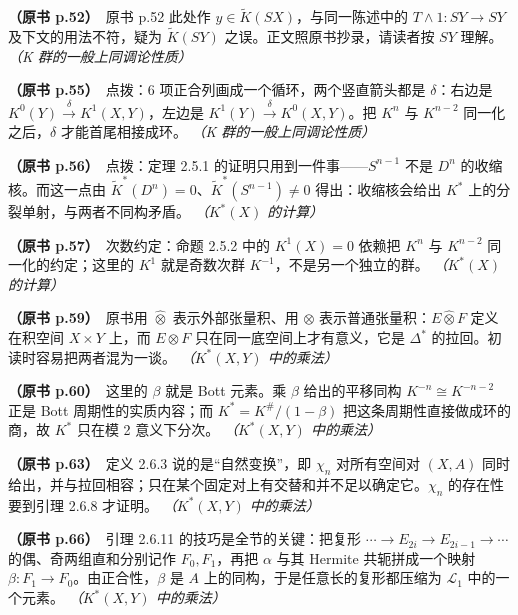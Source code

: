 \noindent \textbf{（原书 p.52）}\ 原书 p.52 此处作 $y\in\tilde K(SX)$，与同一陈述中的 $T\wedge1\colon SY\to SY$ 及下文的用法不符，疑为 $\tilde K(SY)$ 之误。正文照原书抄录，请读者按 $SY$ 理解。 \textit{（K 群的一般上同调论性质）}\par\smallskip

\noindent \textbf{（原书 p.55）}\ 点拨：6 项正合列画成一个循环，两个竖直箭头都是 $\delta$：右边是 $K^0(Y)\xrightarrow{\delta}K^1(X,Y)$，左边是 $K^1(Y)\xrightarrow{\delta}K^0(X,Y)$。把 $K^n$ 与 $K^{n-2}$ 同一化之后，$\delta$ 才能首尾相接成环。 \textit{（K 群的一般上同调论性质）}\par\smallskip

\noindent \textbf{（原书 p.56）}\ 点拨：定理 2.5.1 的证明只用到一件事——$S^{n-1}$ 不是 $D^n$ 的收缩核。而这一点由 $\tilde K^*(D^n)=0$、$\tilde K^*(S^{n-1})\ne0$ 得出：收缩核会给出 $K^*$ 上的分裂单射，与两者不同构矛盾。 \textit{（$K^*(X)$ 的计算）}\par\smallskip

\noindent \textbf{（原书 p.57）}\ 次数约定：命题 2.5.2 中的 $K^1(X)=0$ 依赖把 $K^n$ 与 $K^{n-2}$ 同一化的约定；这里的 $K^1$ 就是奇数次群 $K^{-1}$，不是另一个独立的群。 \textit{（$K^*(X)$ 的计算）}\par\smallskip

\noindent \textbf{（原书 p.59）}\ 原书用 $\hat\otimes$ 表示外部张量积、用 $\otimes$ 表示普通张量积：$E\hat\otimes F$ 定义在积空间 $X\times Y$ 上，而 $E\otimes F$ 只在同一底空间上才有意义，它是 $\Delta^*$ 的拉回。初读时容易把两者混为一谈。 \textit{（$K^*(X,Y)$ 中的乘法）}\par\smallskip

\noindent \textbf{（原书 p.60）}\ 这里的 $\beta$ 就是 Bott 元素。乘 $\beta$ 给出的平移同构 $K^{-n}\cong K^{-n-2}$ 正是 Bott 周期性的实质内容；而 $K^*=K^{\#}/(1-\beta)$ 把这条周期性直接做成环的商，故 $K^*$ 只在模 2 意义下分次。 \textit{（$K^*(X,Y)$ 中的乘法）}\par\smallskip

\noindent \textbf{（原书 p.63）}\ 定义 2.6.3 说的是“自然变换”，即 $\chi_n$ 对所有空间对 $(X,A)$ 同时给出，并与拉回相容；只在某个固定对上有交替和并不足以确定它。$\chi_n$ 的存在性要到引理 2.6.8 才证明。 \textit{（$K^*(X,Y)$ 中的乘法）}\par\smallskip

\noindent \textbf{（原书 p.66）}\ 引理 2.6.11 的技巧是全节的关键：把复形 $\cdots\to E_{2i}\to E_{2i-1}\to\cdots$ 的偶、奇两组直和分别记作 $F_0,F_1$，再把 $\alpha$ 与其 Hermite 共轭拼成一个映射 $\beta\colon F_1\to F_0$。由正合性，$\beta$ 是 $A$ 上的同构，于是任意长的复形都压缩为 $\mathcal{L}_1$ 中的一个元素。 \textit{（$K^*(X,Y)$ 中的乘法）}\par\smallskip

